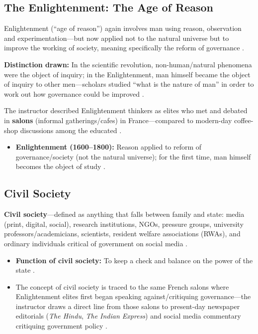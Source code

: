 \subsection{The Enlightenment: The Age of Reason}
Enlightenment (``age of reason'') again involves man using reason, observation and experimentation---but now applied not to the natural universe but to improve the working of society, meaning specifically the reform of governance .

\begin{KeyConcept}
\textbf{Distinction drawn:} In the scientific revolution, non-human/natural phenomena were the object of inquiry; in the Enlightenment, man himself became the object of inquiry to other men---scholars studied ``what is the nature of man'' in order to work out how governance could be improved .

The instructor described Enlightenment thinkers as elites who met and debated in \textbf{salons} (informal gatherings/cafes) in France---compared to modern-day coffee-shop discussions among the educated .
\end{KeyConcept}

\begin{QuickRevision}
\begin{itemize}
    \item \textbf{Enlightenment (1600--1800):} Reason applied to reform of governance/society (not the natural universe); for the first time, man himself becomes the object of study .
\end{itemize}
\end{QuickRevision}

\subsection{Civil Society}

\begin{KeyConcept}
\textbf{Civil society}---defined as anything that falls between family and state: media (print, digital, social), research institutions, NGOs, pressure groups, university professors/academicians, scientists, resident welfare associations (RWAs), and ordinary individuals critical of government on social media .
\begin{itemize}
    \item \textbf{Function of civil society:} To keep a check and balance on the power of the state .
    \item The concept of civil society is traced to the same French salons where Enlightenment elites first began speaking against/critiquing governance---the instructor draws a direct line from those salons to present-day newspaper editorials (\textit{The Hindu}, \textit{The Indian Express}) and social media commentary critiquing government policy .
\end{itemize}
\end{KeyConcept}

